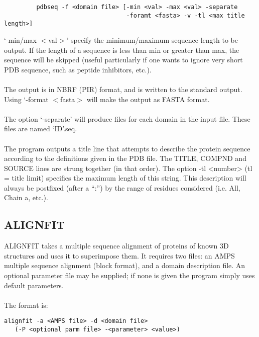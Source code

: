 \begin{scriptsize}\begin{verbatim}
         pdbseq -f <domain file> [-min <val> -max <val> -separate 
                                  -foramt <fasta> -v -tl <max title length>]
\end{verbatim} \end{scriptsize}

`-min/max $<$val$>$' specify the minimum/maximum sequence length
to be output.  If the length of a sequence is less than min or greater than max, the
sequence will be skipped (useful particularly if one wants to ignore very short
PDB sequence, such as peptide inhibitors, etc.).\\
\\
The output is in NBRF (PIR) format, and is written to the standard
output.  Using `-format $<$fasta$>$ will make the output as FASTA
format.\\
\\
The option `-separate' will produce files for each domain in the input file.
These files are named `ID'.seq.\\
\\
The program outputs a title line that attempts to describe the protein
sequence according to the definitions given in the PDB file.  The
TITLE, COMPND and SOURCE lines are strung together (in that order).
The option -tl <number> (tl = title limit) specifies the maximum length of this string.
This description will always be postfixed (after a ``:'') by 
the range of residues considered (i.e. All, Chain a, etc.).


\subsection{ALIGNFIT}

ALIGNFIT takes a multiple sequence alignment of proteins of known 3D structures
and uses it to superimpose them. It requires two files: an 
AMPS multiple sequence alignment (block format), and a domain 
description file.  An optional parameter file may be supplied; if 
none is given the program simply uses default parameters.\\
\\
The format is:\\

\begin{scriptsize}\begin{verbatim}
alignfit -a <AMPS file> -d <domain file> 
   (-P <optional parm file> -<parameter> <value>)
\end{verbatim} \end{scriptsize}

